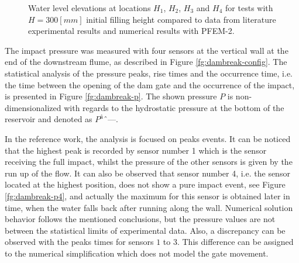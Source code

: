 \documentclass[a4paper,conference]{IEEEtran}
\begin{document}
\begin{figure}[h]
{    }
   \caption{Water level elevations at locations $H_1$, $H_2$, $H_3$ and $H_4$ for tests with $H=300[mm]$ initial filling height compared to data from literature experimental results\cite{Lobovsky13} and numerical results with PFEM-2.}
   \label{fg:dambreak-h}                %
\end{figure}

The impact pressure was measured with four sensors at the vertical wall at the end of the downstream flume, as described in Figure \ref{fg:dambreak-config}. The statistical analysis of the pressure peaks, rise times and the occurrence time, i.e. the time between
the opening of the dam gate and the occurrence of the impact, is presented in Figure \ref{fg:dambreak-p}. The shown pressure $P$ is non-dimensionalized with regards to the hydrostatic pressure at the bottom of the reservoir and denoted as $P^â$.

In the reference work, the analysis is focused on peaks events. It can be noticed that the highest peak is recorded by sensor number 1 which is the sensor receiving the full impact, whilst the pressure of the other sensors is given by the run up of the flow. It can also be observed that sensor number 4, i.e. the sensor located at the highest position, does not show a pure impact event, see Figure \ref{fg:dambreak-p4}, and actually the maximum for this sensor is obtained later in time, when the water falls back after running along the wall. Numerical solution behavior follows the mentioned conclusions, but the pressure values are not between the statistical limits of experimental data. Also, a discrepancy can be observed with the peaks times for sensors $1$ to $3$. This difference can be assigned to the numerical simplification which does not model the gate movement.
\end{document}
